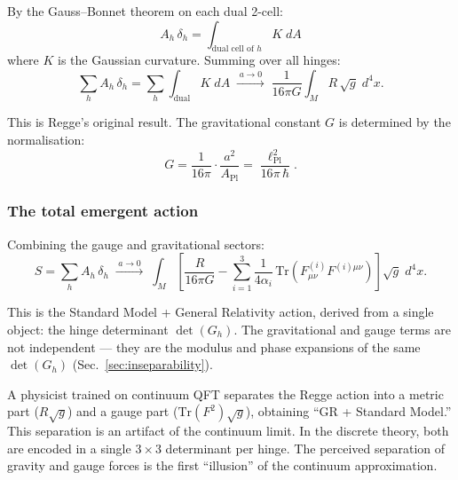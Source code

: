 By the Gauss--Bonnet theorem on each dual 2-cell:
\begin{equation}
A_h\,\delta_h = \int_{\text{dual cell of }h} K\;dA
\end{equation}
where $K$ is the Gaussian curvature.  Summing over all hinges:
\begin{equation}
\sum_h A_h\,\delta_h = \sum_h\int_{\text{dual}} K\;dA \;\xrightarrow{\;a \to 0\;}\; \frac{1}{16\pi G}\int_M R\,\sqrt{g}\;d^4x.
\end{equation}

This is Regge's original result.  The gravitational constant $G$ is determined by the normalisation:
\begin{equation}
G = \frac{1}{16\pi}\cdot\frac{a^2}{A_\text{Pl}} = \frac{\ell_\text{Pl}^2}{16\pi\,\hbar}.
\end{equation}

\subsubsection{The total emergent action}

Combining the gauge and gravitational sectors:
\begin{equation}
\boxed{S = \sum_h A_h\,\delta_h \;\xrightarrow{\;a \to 0\;}\; \int_M\!\left[\frac{R}{16\pi G} - \sum_{i=1}^{3}\frac{1}{4\alpha_i}\,\text{Tr}(F^{(i)}_{\mu\nu}F^{(i)\mu\nu})\right]\sqrt{g}\;d^4x.}
\end{equation}

This is the Standard Model + General Relativity action, derived from a single object: the hinge determinant $\det(G_h)$.  The gravitational and gauge terms are not independent --- they are the modulus and phase expansions of the same $\det(G_h)$ (Sec.~\ref{sec:inseparability}).

\begin{remark}
A physicist trained on continuum QFT separates the Regge action into a metric part ($R\sqrt{g}$) and a gauge part ($\text{Tr}(F^2)\sqrt{g}$), obtaining ``GR + Standard Model.''  This separation is an artifact of the continuum limit.  In the discrete theory, both are encoded in a single $3 \times 3$ determinant per hinge.  The perceived separation of gravity and gauge forces is the first ``illusion'' of the continuum approximation.
\end{remark}
